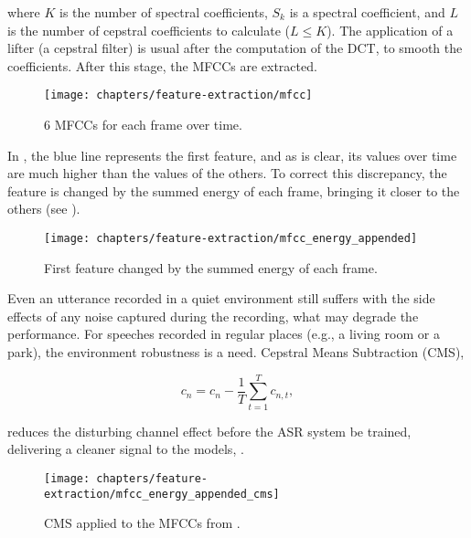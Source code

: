\noindent where $K$ is the number of spectral coefficients, $S_k$ is a spectral coefficient, and $L$ is the number of cepstral coefficients to calculate ($L \leq K$). The application of a lifter (a cepstral filter) is usual after the computation of the DCT, to smooth the coefficients. After this stage, the MFCCs are extracted.

\begin{figure}[ht]
    \centering
    \texttt{[image: chapters/feature-extraction/mfcc]}
    \caption{6 MFCCs for each frame over time.}
    \label{fig:mfcc}
\end{figure}


In , the blue line represents the first feature, and as is clear, its values over time are much higher than the values of the others. To correct this discrepancy, the feature is changed by the summed energy of each frame, bringing it closer to the others (see ).

\begin{figure}[ht]
    \centering
    \texttt{[image: chapters/feature-extraction/mfcc\_energy\_appended]}
    \caption{First feature changed by the summed energy of each frame.}
    \label{fig:mfcc_energy_appended}
\end{figure}


Even an utterance recorded in a quiet environment still suffers with the side effects of any noise captured during the recording, what may degrade the performance. For speeches recorded in regular places (e.g., a living room or a park), the environment robustness is a need. Cepstral Means Subtraction (CMS),

\begin{equation}
    c_n = c_n - \frac{1}{T} \sum_{t=1}^T c_{n,t},
    \label{eq:cms}
\end{equation}

\noindent reduces the disturbing channel effect before the ASR system be trained, delivering a cleaner signal to the models, .

\begin{figure}[ht]
    \centering
    \texttt{[image: chapters/feature-extraction/mfcc\_energy\_appended\_cms]}
    \caption{CMS applied to the MFCCs from .}
    \label{fig:mfcc_energy_appended_cms}
\end{figure}

